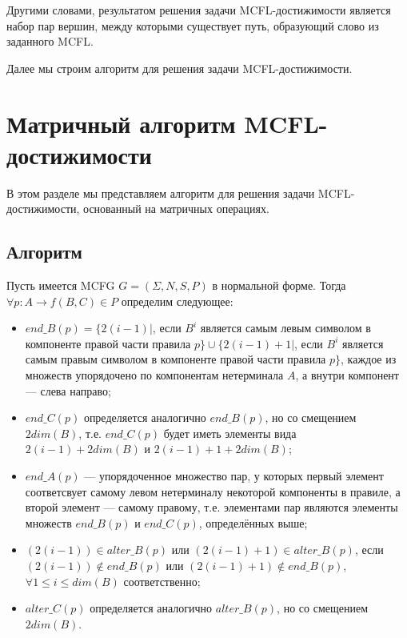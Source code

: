 Другими словами, результатом решения задачи MCFL-достижимости является набор пар вершин, между которыми существует путь, образующий слово из заданного MCFL.

Далее мы строим алгоритм для решения задачи MCFL-достижимости.

\section{Матричный алгоритм MCFL-достижимости}
\label{sec:all-path-algo}
В этом разделе мы представляем алгоритм для решения задачи MCFL-достижимости, основанный на матричных операциях.

\subsection{Алгоритм}

\begin{definition}
	\label{def:sets-end-alter}
	Пусть имеется MCFG $G = (\Sigma, N, S, P)$ в нормальной форме. Тогда $\forall p: A \rightarrow f(B,C) \in P$ определим следующее:
	\begin{itemize}
		\item $end\_B(p) = \{2(i - 1)|$, если $B^i$ является самым левым символом в компоненте правой части правила $p\} \cup \{2(i - 1) + 1 |$, если $B^i$ является самым правым символом в компоненте правой части правила $p\}$, каждое из множеств упорядочено по компонентам нетерминала $A$, а внутри компонент --- слева направо;
		\item $end\_C(p)$ определяется аналогично $end\_B(p)$, но со смещением $2dim(B)$, т.е. $end\_C(p)$ будет иметь элементы вида $2(i - 1) + 2dim(B)$ и $2(i - 1) + 1 + 2dim(B)$;
		\item $end\_A(p)$ --- упорядоченное множество пар, у которых первый элемент соответсвует самому левом нетерминалу некоторой компоненты в правиле, а второй элемент --- самому правому, т.е. элементами пар являются элементы множеств $end\_B(p)$ и $end\_C(p)$, определённых выше;
		\item $(2(i - 1)) \in alter\_B(p)$ или $(2(i - 1) + 1) \in alter\_B(p)$, если $(2(i - 1)) \notin end\_B(p)$ или $(2(i - 1) + 1) \notin end\_B(p)$, $\forall 1 \leq i \leq dim(B)$ соответственно;
		\item $alter\_C(p)$ определяется аналогично $alter\_B(p)$, но со смещением $2dim(B)$.
	\end{itemize}
\end{definition}

